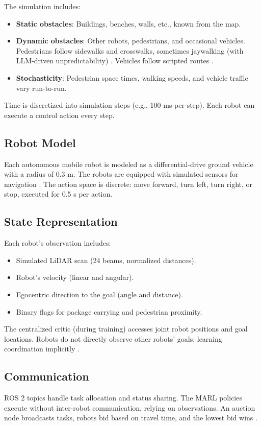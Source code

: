 \documentclass[conference]{IEEEtran}
\begin{document}
The simulation includes:
\begin{itemize}
    \item \textbf{Static obstacles}: Buildings, benches, walls, etc., known from the map.
    \item \textbf{Dynamic obstacles}: Other robots, pedestrians, and occasional vehicles. Pedestrians follow sidewalks and crosswalks, sometimes jaywalking (with LLM-driven unpredictability) \citep{yang2022}. Vehicles follow scripted routes \citep{ztouni2021}.
    \item \textbf{Stochasticity}: Pedestrian space times, walking speeds, and vehicle traffic vary run-to-run.
\end{itemize}
Time is discretized into simulation steps (e.g., 100 ms per step). Each robot can execute a control action every step.

\subsection{Robot Model}
Each autonomous mobile robot is modeled as a differential-drive ground vehicle with a radius of 0.3 m. The robots are equipped with simulated sensors for navigation \citep{ztouni2021, galiat2023}. The action space is discrete: move forward, turn left, turn right, or stop, executed for 0.5 s per action.

\subsection{State Representation}
Each robot’s observation includes:
\begin{itemize}
    \item Simulated LiDAR scan (24 beams, normalized distances).
    \item Robot’s velocity (linear and angular).
    \item Egocentric direction to the goal (angle and distance).
    \item Binary flags for package carrying and pedestrian proximity.
\end{itemize}
The centralized critic (during training) accesses joint robot positions and goal locations. Robots do not directly observe other robots’ goals, learning coordination implicitly \citep{choi2023}.

\subsection{Communication}
ROS 2 topics handle task allocation and status sharing. The MARL policies execute without inter-robot communication, relying on observations. An auction node broadcasts tasks, robots bid based on travel time, and the lowest bid wins \citep{kayy2017}.
\end{document}
